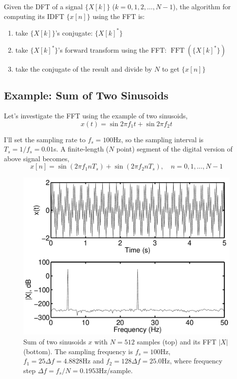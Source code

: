 Given the DFT of a signal $\{X[k]\}$ ($k=0,1,2,\ldots, N-1$), the
algorithm for computing its IDFT $\{x[n]\}$ using the FFT is:
\begin{enumerate}
\item take $\{X[k]\}$'s conjugate:  $\{X[k]^*\}$
\item take $\{X[k]^*\}$'s forward transform using the FFT:
$\operatorname{FFT}(\{X[k]^*\})$
\item take the conjugate of the result and divide by $N$ to get $\{x[n]\}$
\end{enumerate}

\subsection{Example: Sum of Two Sinusoids}

Let's investigate the FFT using the example of two sinusoids,
\begin{equation}
x(t) = \sin 2\pi f_1 t + \sin 2\pi f_2 t
\end{equation}

I'll set the sampling rate to $f_s=100$Hz, so the sampling interval is
$T_s=1/f_s=0.01$s. A finite-length ($N$ point) segment of the digital
version of above signal becomes,
\begin{equation}
x[n] = \sin(2\pi f_1 n T_s) + \sin(2\pi f_2 n T_s),
      \quad n=0,1,\ldots, N-1
\end{equation}

\begin{figure}
\centerline{\includegraphics[width=5in]{ch-fft/fft_sin_xX}}
\caption[Sum of two sinusoids with 512 samples and its 
FFT]{Sum of two sinusoids $x$ with $N=512$ samples (top) and its
FFT $|X|$ (bottom). The sampling frequency is $f_s=100$Hz, $f_1=25
\Delta f=4.8828$Hz and $f_2=128 \Delta f=25.0$Hz, where frequency step
$\Delta f=f_s/N=0.1953$Hz/sample.
\label{fig:fft-sin-xX}}
\end{figure}

